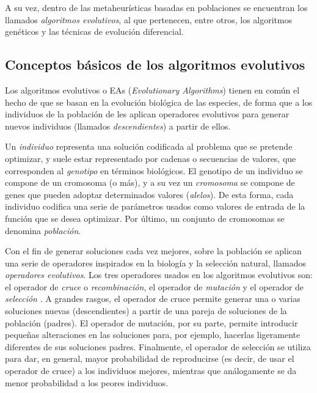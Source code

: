 A su vez, dentro de las metaheurísticas basadas en poblaciones se encuentran los llamados \emph{algoritmos evolutivos}, al que pertenecen, entre otros, los algoritmos genéticos y las técnicas de evolución diferencial.

\subsection{Conceptos básicos de los algoritmos evolutivos}

Los algoritmos evolutivos o EAs (\emph{Evolutionary Algorithms}) tienen en común el hecho de que se basan en la evolución biológica de las especies, de forma que a los individuos de la población de les aplican operadores evolutivos para generar nuevos individuos (llamados \emph{descendientes}) a partir de ellos.
 
Un \emph{individuo} representa una solución codificada al problema que se pretende optimizar, y suele estar representado por cadenas o secuencias de valores, que corresponden al \emph{genotipo} en términos biológicos. El genotipo de un individuo se compone de un cromosoma (o más), y a su vez un \emph{cromosoma} se compone de genes que pueden adoptar determinados valores (\emph{alelos}). De esta forma, cada individuo codifica una serie de parámetros usados como valores de entrada de la función que se desea optimizar. Por último, un conjunto de cromosomas se denomina \emph{población}. \cite{coello2007evolutionary}

Con el fin de generar soluciones cada vez mejores, sobre la población se aplican una serie de operadores inspirados en la biología y la selección natural, llamados \emph{operadores evolutivos}. Los tres operadores usados en los algoritmos evolutivos son: el operador de \emph{cruce} o \emph{recombinación}, el operador de \emph{mutación} y el operador de \emph{selección} \cite{coello2007evolutionary}. A grandes rasgos, el operador de cruce permite generar una o varias soluciones nuevas (descendientes) a partir de una pareja de soluciones de la población (padres). El operador de mutación, por su parte, permite introducir pequeñas alteraciones en las soluciones para, por ejemplo, hacerlas ligeramente diferentes de sus soluciones padres. Finalmente, el operador de selección se utiliza para dar, en general, mayor probabilidad de reproducirse (es decir, de usar el operador de cruce) a los individuos mejores, mientras que análogamente se da menor probabilidad a los peores individuos.


